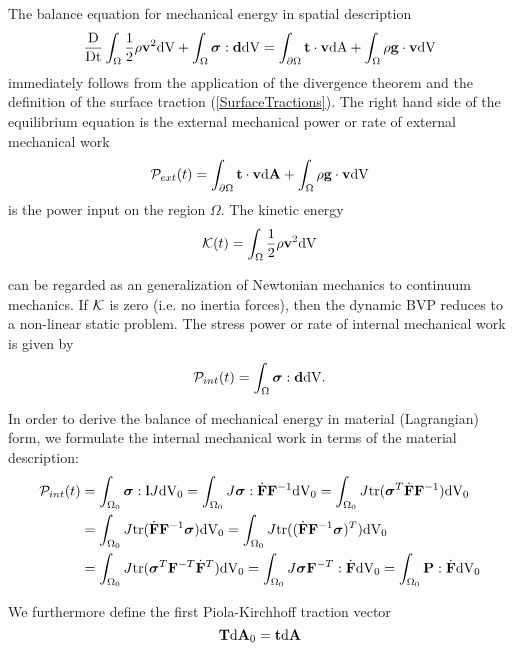 The balance equation for mechanical energy in spatial description
 \begin{equation}
    \frac{\textnormal{D}}{\textnormal{Dt}} \int_{ \Omega} \frac{1}{2} \rho \mathbf {v} ^2  \textnormal{dV} +   \int_{ \Omega} \boldsymbol{\sigma} : \mathbf {d}    \textnormal{dV}     =  \int_{ \partial \Omega} \mathbf {t}  \cdot \mathbf {v}    \textnormal{dA} +  \int_{ \Omega} \rho \mathbf {g}  \cdot \mathbf {v}   \textnormal{dV} 
\label{MechEnergyBalanceSpatial}
\end{equation}
immediately follows from the application of the divergence theorem and the definition of the surface traction (\ref{SurfaceTractions}). The right hand side of the equilibrium equation is the external mechanical power or rate of external mechanical work
 \begin{equation}
\mathcal P _{ext} (t)     =  \int_{ \partial \Omega} \mathbf {t}  \cdot \mathbf {v}    \textnormal{d}\mathbf{A} + \int_{ \Omega} \rho \mathbf {g}  \cdot \mathbf {v}   \textnormal{dV}  
\end{equation}
is the power input on the region $\Omega$. The kinetic energy
 \begin{equation}
\mathcal K  (t)     =    \int_{ \Omega} \frac{1}{2} \rho  \mathbf {v} ^2  \textnormal{dV}
\end{equation}

can be regarded as an generalization of Newtonian mechanics to continuum mechanics. If $\mathcal K $ is zero (i.e. no inertia forces), then the dynamic BVP reduces to a non-linear static problem. The stress power or rate of internal mechanical work is given by
 \begin{equation}
\mathcal P _{int} (t)     =   \int_{ \Omega} \boldsymbol{\sigma} : \mathbf {d}    \textnormal{dV}.
\end{equation}

In order to derive the balance of mechanical energy in material (Lagrangian) form, we formulate the internal mechanical work in terms of the material description: 
\begin{alignat}{1}
\mathcal P _{int} (t)    &=  \int_{ \Omega _ 0} \boldsymbol{\sigma} : \mathbf {l}   J  \textnormal{dV}_0  = \int_{ \Omega _ 0} J \boldsymbol{\sigma} :  \dot{\mathbf {F }}  \mathbf {F } ^{-1}   \textnormal{dV}_0 = \int_{ \Omega _ 0} J \textnormal{tr}  (\boldsymbol{\sigma} ^T  {\dot{\mathbf {F }}  \mathbf {F } ^{-1}} )  \textnormal{dV}_0 \\
&= \int_{ \Omega _ 0} J \textnormal{tr}  (   {\dot{\mathbf {F }}  \mathbf {F } ^{-1}} \boldsymbol{\sigma})   \textnormal{dV}_0 = \int_{ \Omega _ 0} J \textnormal{tr}  ( (   {\dot{\mathbf {F }}  \mathbf {F } ^{-1}} \boldsymbol{\sigma}) ^T)   \textnormal{dV}_0  \\
&= \int_{ \Omega _ 0} J \textnormal{tr}  ( \boldsymbol{\sigma} ^T \mathbf {F } ^{-T} \dot{\mathbf {F }}  ^T )     \textnormal{dV}_0 =  \int_{ \Omega _ 0} J \boldsymbol{\sigma}  \mathbf {F } ^{-T} : \dot{\mathbf {F }}       \textnormal{dV}_0 = \int_{ \Omega _ 0} \mathbf {P}  : \dot{\mathbf {F }}   \textnormal{dV}_0 
\end{alignat}


We furthermore define the first Piola-Kirchhoff traction vector
 \begin{equation}
\mathbf {T}   \textnormal{d}\mathbf{A}_0 = \mathbf {t}   \textnormal{d}\mathbf{A}
\end{equation}

